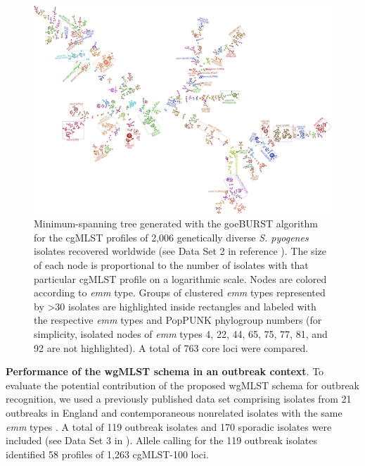 \begin{landscape}
\begin{figure}[!ht]
    \centering
    \includegraphics[height=0.85\textheight]{figures/chapter 4/Figure2.pdf}
    \caption[Minimum-spanning tree generated with the goeBURST algorithm for the \ac{cgMLST} profiles of 2,006 genetically diverse \textit{S. pyogenes} isolates recovered worldwide.]{Minimum-spanning tree generated with the goeBURST algorithm for the \ac{cgMLST} profiles of 2,006 genetically diverse \textit{S. pyogenes} isolates recovered worldwide \cite{davies_atlas_2019} (see Data Set 2 in reference \cite{friaes_supplemental_2023}). The size of each node is proportional to the number of isolates with that particular \ac{cgMLST} profile on a logarithmic scale. Nodes are colored according to \textit{emm} type. Groups of clustered \textit{emm} types represented by >30 isolates are highlighted inside rectangles and labeled with the respective \textit{emm} types and PopPUNK phylogroup numbers (for simplicity, isolated nodes of \textit{emm} types 4, 22, 44, 65, 75, 77, 81, and 92 are not highlighted). A total of 763 core loci were compared.}
    \label{fig:chap4_figure2}
\end{figure}
\end{landscape}

\textbf{Performance of the wgMLST schema in an outbreak context}. To evaluate the potential contribution of the proposed \ac{wgMLST} schema for outbreak recognition, we used a previously published data set comprising isolates from 21 outbreaks in England and contemporaneous nonrelated isolates with the same \textit{emm} types \cite{coelho_genomic_2019}. A total of 119 outbreak isolates and 170 sporadic isolates were included (see Data Set 3 in \cite{friaes_supplemental_2023}). Allele calling for the 119 outbreak isolates identified 58 profiles of 1,263 cgMLST-100 loci.

